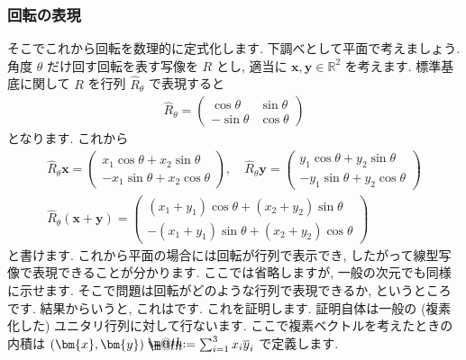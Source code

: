 \documentclass[openany, a4paper, oneside]{book}
\makeatletter
\newcommand*{\defeq}{\mathrel{\rlap{%
\raisebox{0.3ex}{$\m@th\cdot$}}%
\raisebox{-0.3ex}{$\m@th\cdot$}}%
=}
\theoremstyle{break}
\theoremstyle{breakdefn}
\newcommand{\bbR}{\mathbb{R}}
\makeatother
\begin{document}
\subsubsection{回転の表現}
\label{sec-4-3-2-3-3}

そこでこれから回転を数理的に定式化します.
下調べとして平面で考えましょう.
角度 $\theta$ だけ回す回転を表す写像を $R$ とし, 適当に $\bm{x} , \bm{y} \in \bbR^2$ を考えます.
標準基底に関して $R$ を行列 $\hat{R}_{\theta}$ で表現すると
    \begin{align}
        \hat{R} _{ \theta }
        =
        \begin{pmatrix}
            \cos \theta & \sin \theta \\
            -\sin \theta & \cos \theta
        \end{pmatrix}
    \end{align}
となります.
これから
    \begin{gather}
        \hat{R} _{ \theta } \bm{x}
        =
        \begin{pmatrix}
            x_1 \cos \theta + x_2 \sin \theta \\
            -x_1 \sin \theta + x_2 \cos \theta
        \end{pmatrix}
        , \quad
        \hat{R} _{ \theta } \bm{y}
        =
        \begin{pmatrix}
            y_1 \cos \theta + y_2 \sin \theta \\
            -y_1 \sin \theta + y_2 \cos \theta
        \end{pmatrix} \\
        \hat{R} _{ \theta } ( \bm{x} + \bm{y} )
        =
        \begin{pmatrix}
            ( x_1 + y_1 ) \cos \theta + (x_2 + y_2) \sin \theta \\
            -( x_1 + y_1 ) \sin \theta + ( x_2 + y_2 ) \cos \theta
        \end{pmatrix}
    \end{gather}
と書けます.
これから平面の場合には回転が行列で表示でき, したがって線型写像で表現できることが分かります.
ここでは省略しますが, 一般の次元でも同様に示せます.
そこで問題は回転がどのような行列で表現できるか, というところです.
結果からいうと, これはです.
これを証明します.
証明自体は一般の (複素化した) ユニタリ行列に対して行ないます.
ここで複素ベクトルを考えたときの内積は $( \bm{x} , \bm{y} ) \defeq \sum_{i=1}^3 x_i \overline{y}_i$
で定義します.
\end{document}
